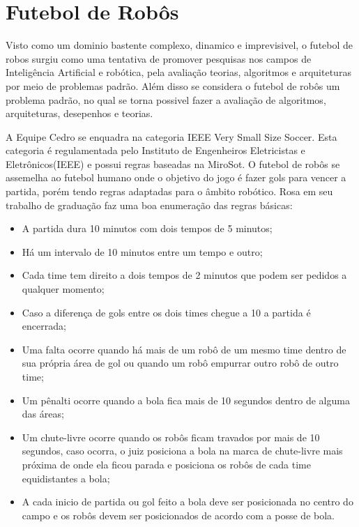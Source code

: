 \section{Futebol de Robôs}
 Visto como um dominio bastente complexo, dinamico e imprevisivel\cite{Faria2006,Costa:2000}, o futebol de robos surgiu como uma tentativa de promover pesquisas nos campos de Inteligência Artificial e robótica, pela avaliação teorias, algoritmos e arquiteturas por meio de problemas padrão\cite{Kitano:1997}. Além disso se considera o futebol de robôs um problema padrão, no qual se torna possivel fazer a avaliação de algoritmos, arquiteturas, desepenhos e teorias\cite{Faria2006}.

 A Equipe Cedro se enquadra na categoria IEEE Very Small Size Soccer. Esta categoria é regulamentada pelo Instituto de Engenheiros Eletricistas e Eletrônicos(IEEE) e possui regras baseadas na MiroSot\cite{Rosa:2015}. O futebol de robôs se assemelha ao futebol humano onde o objetivo do jogo é fazer gols para vencer a partida, porém tendo regras adaptadas para o âmbito robótico. 
 Rosa\cite{Rosa:2015} em seu trabalho de graduação faz uma boa enumeração das regras básicas:
 \begin{itemize}
 \item A partida dura 10 minutos com dois tempos de 5 minutos;
  \item Há um intervalo de 10 minutos entre um tempo e outro;
   \item Cada time tem direito a dois tempos de 2 minutos que podem ser pedidos a qualquer
   momento;
    \item Caso a diferença de gols entre os dois times chegue a 10 a partida é encerrada;
     \item Uma falta ocorre quando há mais de um robô de um mesmo time dentro de sua própria
     área de gol ou quando um robô empurrar outro robô de outro time;
     \item Um pênalti ocorre quando a bola fica mais de 10 segundos dentro de alguma das áreas;
     \item Um chute-livre ocorre quando os robôs ficam travados por mais de 10 segundos, caso
     ocorra, o juiz posiciona a bola na marca de chute-livre mais próxima de onde ela ficou
     parada e posiciona os robôs de cada time equidistantes a bola;
     \item A cada inicio de partida ou gol feito a bola deve ser posicionada no centro do campo e os
     robôs devem ser posicionados de acordo com a posse de bola.
 \end{itemize}
